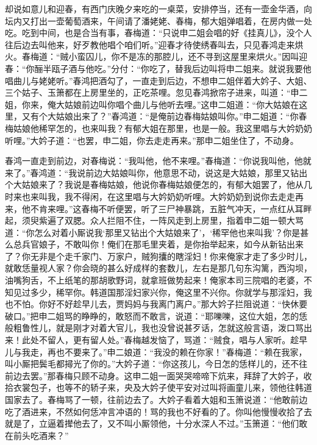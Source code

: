 却说如意儿和迎春，有西门庆晚夕来吃的一桌菜，安排停当，还有一壶金华酒，向坛内又打出一壶葡萄酒来，午间请了潘姥姥、春梅，郁大姐弹唱着，在房内做一处吃。吃到中间，也是合当有事，春梅道：“只说申二姐会唱的好《挂真儿》，没个人往后边去叫他来，好歹教他唱个咱们听。”迎春才待使绣春叫去，只见春鸿走来烘火。春梅道：“贼小蛮囚儿，你不是冻的那腔儿，还不寻到这屋里来烘火。”因叫迎春：“你酾半瓯子酒与他吃。”分付：“你吃了，替我后边叫将申二姐来。就说我要他唱曲儿与姥姥听。”春鸿把酒勾了，一直走到后边，不想申二姐伴着大妗子、大姐、三个姑子、玉箫都在上房里坐的，正吃茶哩。忽见春鸿掀帘子进来，叫道：“申二姐，你来，俺大姑娘前边叫你唱个曲儿与他听去哩。”这申二姐道：“你大姑娘在这里，又有个大姑娘出来了？”春鸿道：“是俺前边春梅姑娘叫你。”申二姐道：“你春梅姑娘他稀罕怎的，也来叫我？有郁大姐在那里，也是一般。我这里唱与大妗奶奶听哩。”大妗子道：“也罢，申二姐，你去走走再来。”那申二姐坐住了，不动身。

春鸿一直走到前边，对春梅说：“我叫他，他不来哩。”春梅道：“你说我叫他，他就来了。”春鸿道：“我说前边大姑娘叫你，他意思不动，说这是大姑娘，那里又钻出个大姑娘来了？我说是春梅姑娘，他说你春梅姑娘便怎的，有郁大姐罢了，他从几时来也来叫我，我不得闲，在这里唱与大妗奶奶听哩。大妗奶奶到说你去走走再来，他不肯来哩。”这春梅不听便罢，听了三尸神暴跳，五脏气冲天，一点红从耳畔起，须臾紫遍了双腮。众人拦阻不住，一阵风走到上房里，指着申二姐一顿大骂道：“你怎么对着小厮说我‘那里又钻出个大姑娘来了’，‘稀罕他也来叫我’？你是甚么总兵官娘子，不敢叫你！俺们在那毛里夹着，是你抬举起来，如今从新钻出来了？你无非是个走千家门、万家户，贼狗攮的瞎淫妇！你来俺家才走了多少时儿，就敢恁量视人家？你会晓的甚么好成样的套数儿，左右是那几句东沟篱，西沟坝，油嘴狗舌，不上纸笔的那胡歌野词，就拿班做势起来！俺家本司三院唱的老婆，不知见过多少，稀罕你。韩道国那淫妇家兴你，俺这里不兴你。你就学与那淫妇，我也不怕。你好不好趁早儿去，贾妈妈与我离门离户。”那大妗子拦阻说道：“快休要破口。”把申二姐骂的睁睁的，敢怒而不敢言，说道：“耶嚛嚛，这位大姐，怎的恁般粗鲁性儿，就是刚才对着大官儿，我也没曾说甚歹话，怎就这般言语，泼口骂出来！此处不留人，更有留人处。”春梅越发恼了，骂道：“贼食，唱与人家听。趁早儿与我走，再也不要来了。”申二娘道：“我没的赖在你家！”春梅道：“赖在我家，叫小厮把鬓毛都撏光了你的。”大妗子道：“你这孩儿，今日怎的恁样儿的，还不往前边去罢。”那春梅只顾不动身。这申二姐一面哭哭啼啼下炕来，拜辞了大妗子，收拾衣裳包子，也等不的轿子来，央及大妗子使平安对过叫将画童儿来，领他往韩道国家去了。春梅骂了一顿，往前边去了。大妗子看着大姐和玉箫说道：“他敢前边吃了酒进来，不然如何恁冲言冲语的！骂的我也不好看的了。你叫他慢慢收拾了去就是了，立逼着撵他去了，又不叫小厮领他，十分水深人不过。”玉箫道：“他们敢在前头吃酒来？”

